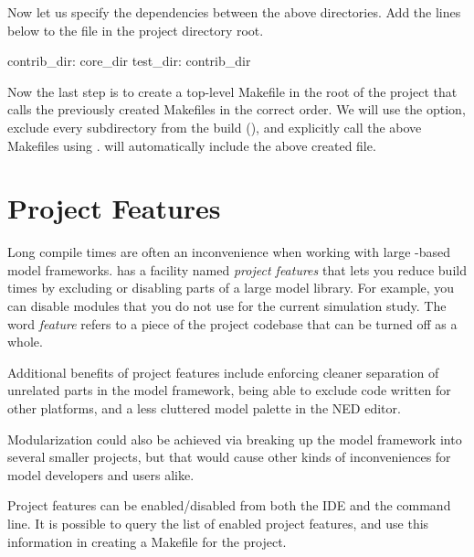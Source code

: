 Now let us specify the dependencies between the above directories.
Add the lines below to the  file in the project directory root.

\begin{filelisting}
contrib_dir: core_dir
test_dir: contrib_dir
\end{filelisting}

Now the last step is to create a top-level Makefile in the root of the project that
calls the previously created Makefiles in the correct order. We will use the
 option, exclude every subdirectory from the build (), and explicitly call
the above Makefiles using .  will automatically include
the above created  file.


\section{Project Features}
\label{sec:build-sim-progs:project-features}

Long compile times are often an inconvenience when working with large
{\opp}-based model frameworks. {\opp} has a facility named \textit{project
features} that lets you reduce build times by excluding or disabling parts
of a large model library. For example, you can disable modules that you do
not use for the current simulation study. The word \textit{feature} refers
to a piece of the project codebase that can be turned off as a whole.

Additional benefits of project features include enforcing cleaner
separation of unrelated parts in the model framework, being able to exclude
code written for other platforms, and a less cluttered model palette in the
NED editor.

\begin{note}
  Modularization could also be achieved via breaking up the model framework
  into several smaller projects, but that would cause other kinds of
  inconveniences for model developers and users alike.
\end{note}

Project features can be enabled/disabled from both the IDE and the command line.
It is possible to query the list of enabled project features, and use this
information in creating a Makefile for the project.

